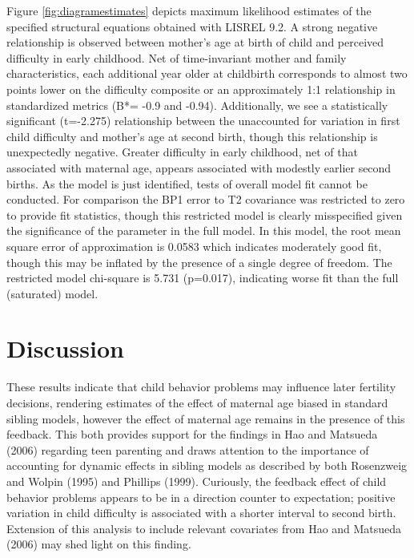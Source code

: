\documentclass[]{article}
\begin{document}
Figure \ref{fig:diagramestimates} depicts maximum likelihood estimates
of the specified structural equations obtained with LISREL 9.2. A strong
negative relationship is observed between mother's age at birth of child
and perceived difficulty in early childhood. Net of time-invariant
mother and family characteristics, each additional year older at
childbirth corresponds to almost two points lower on the difficulty
composite or an approximately 1:1 relationship in standardized metrics
(B*= -0.9 and -0.94). Additionally, we see a statistically significant
(t=-2.275) relationship between the unaccounted for variation in first
child difficulty and mother's age at second birth, though this
relationship is unexpectedly negative. Greater difficulty in early
childhood, net of that associated with maternal age, appears associated
with modestly earlier second births. As the model is just identified,
tests of overall model fit cannot be conducted. For comparison the BP1
error to T2 covariance was restricted to zero to provide fit statistics,
though this restricted model is clearly misspecified given the
significance of the parameter in the full model. In this model, the root
mean square error of approximation is 0.0583 which indicates moderately
good fit, though this may be inflated by the presence of a single degree
of freedom. The restricted model chi-square is 5.731 (p=0.017),
indicating worse fit than the full (saturated) model.

\section{Discussion}\label{discussion}

These results indicate that child behavior problems may influence later
fertility decisions, rendering estimates of the effect of maternal age
biased in standard sibling models, however the effect of maternal age
remains in the presence of this feedback. This both provides support for
the findings in Hao and Matsueda (2006) regarding teen parenting and
draws attention to the importance of accounting for dynamic effects in
sibling models as described by both Rosenzweig and Wolpin (1995) and
Phillips (1999). Curiously, the feedback effect of child behavior
problems appears to be in a direction counter to expectation; positive
variation in child difficulty is associated with a shorter interval to
second birth. Extension of this analysis to include relevant covariates
from Hao and Matsueda (2006) may shed light on this finding.
\end{document}
